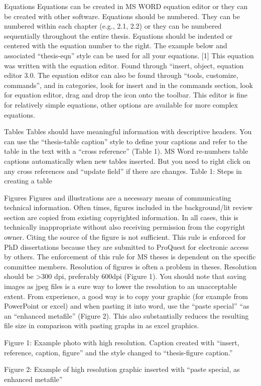Equations
Equations can be created in MS WORD equation editor or they can be created with other software.  Equations should be numbered.  They can be numbered within each chapter (e.g., 2.1, 2.2) or they can be numbered sequentially throughout the entire thesis.  Equations should be indented or centered with the equation number to the right.  The example below and associated “thesis-eqn” style can be used for all your equations.
		[1]
This equation was written with the equation editor. Found through “insert, object, equation editor 3.0. The equation editor can also be found through “tools, customize, commands”, and in categories, look for insert and in the commands section, look for equation editor, drag and drop the icon onto the toolbar. This editor is fine for relatively simple equations, other options are available for more complex equations.

Tables
Tables should have meaningful information with descriptive headers.  You can use the “thesis-table caption” style to define your captions and refer to the table in the text with a “cross reference” (Table 1).  MS Word re-numbers table captions automatically when new tables inserted.  But you need to right click on any cross references and “update field” if there are changes.
Table 1: Steps in creating a table

Figures
Figures and illustrations are a necessary means of communicating technical information.  Often times, figures included in the background/lit review section are copied from existing copyrighted information.  In all cases, this is technically inappropriate without also receiving permission from the copyright owner.  Citing the source of the figure is not sufficient. This rule is enforced for PhD dissertations because they are submitted to ProQuest for electronic access by others.  The enforcement of this rule for MS theses is dependent on the specific committee members.
Resolution of figures is often a problem in theses.  Resolution should be >300 dpi, preferably 600dpi (Figure 1).  You should note that saving images as jpeg files is a sure way to lower the resolution to an unacceptable extent.  From experience, a good way is to copy your graphic (for example from PowerPoint or excel) and when pasting it into word, use the “paste special” “as an “enhanced metafile” (Figure 2).  This also substantially reduces the resulting file size in comparison with pasting graphs in as excel graphics.

Figure 1: Example photo with high resolution.  Caption created with “insert, reference, caption, figure” and the style changed to “thesis-figure caption.”



Figure 2: Example of high resolution graphic inserted with “paste special, as enhanced metafile”